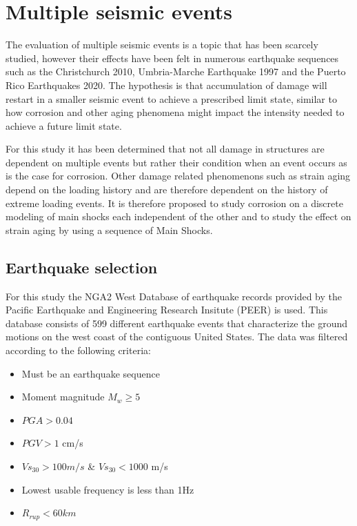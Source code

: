 \section{Multiple seismic events}

The evaluation of multiple seismic events is a topic that has been scarcely studied, however their effects have been felt in numerous earthquake sequences such as the Christchurch 2010, Umbria-Marche Earthquake 1997 and the Puerto Rico Earthquakes 2020. The hypothesis is that accumulation of damage will restart in a smaller seismic event to achieve a prescribed limit state, similar to how corrosion and other aging phenomena might impact the intensity needed to achieve a future limit state. 

For this study it has been determined that not all damage in structures are dependent on multiple events but rather their condition when an event occurs as is the case for corrosion. Other damage related phenomenons such as strain aging depend on the loading history and are therefore dependent on the history of extreme loading events. It is therefore proposed to study corrosion on a discrete modeling of main shocks each independent of the other and to study the effect on strain aging by using a sequence of Main Shocks.

\subsection{Earthquake selection}

For this study the NGA2 West Database of earthquake records provided by the Pacific Earthquake and Engineering Research Insitute (PEER) \cite{Ancheta2014} is used. This database consists of 599 different earthquake events that characterize the ground motions on the west coast of the contiguous United States. The data was filtered according to the following criteria:

\begin{itemize}
	\item Must be an earthquake sequence
	\item Moment magnitude $M_w \geqslant 5$
	\item $PGA>0.04$
	\item $PGV>1$ cm/s
	\item $Vs_{30}>100m/s$ \& $Vs_{30}<1000$ m/s
	\item Lowest usable frequency is less than 1Hz
	\item $R_{rup}<60km$
\end{itemize}

